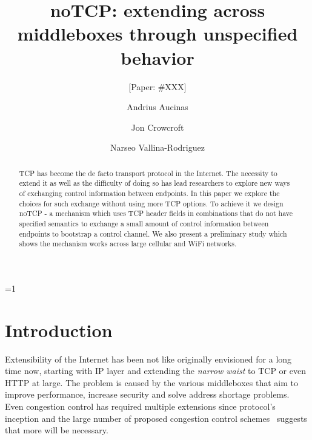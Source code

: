 \documentclass{sig-alternate-10pt}
\def\anon{1}        %
\begin{document}
\date{}


\title{noTCP: extending across middleboxes through unspecified behavior}
\ifnum\anon=1
\author{[Paper: \#XXX]}%
\else
{}
\author{
\alignauthor Andrius Aucinas\\
\and
\alignauthor Jon Crowcroft\\
\and
\alignauthor Narseo Vallina-Rodriguez\\
}
\fi

    
\maketitle
\begin{abstract}
TCP has become the de facto transport protocol in the Internet. The necessity to extend it as well as the difficulty of doing so has lead researchers to explore new ways of exchanging control information between endpoints. In this paper we explore the choices for such exchange without using more TCP options. To achieve it we design noTCP - a mechanism which uses TCP header fields in combinations that do not have specified semantics to exchange a small amount of control information between endpoints to bootstrap a control channel. We also present a preliminary study which shows the mechanism works across large cellular and WiFi networks.
\end{abstract} 

\section{Introduction}
\label{section:intro}

Extensibility of the Internet has been not like originally envisioned for a long time now, starting with IP layer and extending the \emph{narrow waist} to TCP or even HTTP at large. The problem is caused by the various middleboxes that aim to improve performance\cite{Kopparty:2002ht,Chakravorty:2003dm}, increase security\cite{Handley:2001vp,Vutukuru:2008fc} and solve address shortage problems. Even congestion control has required multiple extensions since protocol's inception and the large number of proposed congestion control schemes~\cite{5462976} suggests that more will be necessary.
\end{document}
